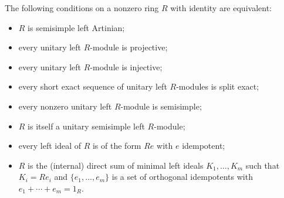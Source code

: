 The following conditions on a nonzero ring $R$ with identity are equivalent:
\begin{itemize}
\item[(i)] $R$ is semisimple left Artinian;
\item[(ii)] every unitary left $R$-module is projective;
\item[(iii)] every unitary left $R$-module is injective;
\item[(iv)] every short exact sequence of unitary left $R$-modules is split exact;
\item[(v)] every nonzero unitary left $R$-module is semisimple;
\item[(vi)] $R$ is itself a unitary semisimple left $R$-module;
\item[(vii)] every left ideal of $R$ is of the form $Re$ with $e$ idempotent;
\item[(viii)] $R$ is the (internal) direct sum of minimal left ideals $K_1, \ldots, K_m$ such that $K_i = Re_i$ and $\{e_1, \ldots, e_m\}$ is a set of orthogonal idempotents with $e_1 + \cdots + e_m = 1_R$.
\end{itemize}
